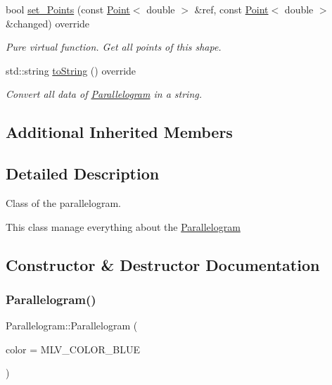 \begin{DoxyCompactItemize}
bool \hyperlink{classParallelogram_ab74583703a60e4b798d7048aa684f44e}{set\+\_\+\+Points} (const \hyperlink{classPoint}{Point}$<$ double $>$ \&ref, const \hyperlink{classPoint}{Point}$<$ double $>$ \&changed) override
\begin{DoxyCompactList}\small\item\em Pure virtual function. Get all points of this shape. \end{DoxyCompactList}\item 
std\+::string \hyperlink{classParallelogram_a9caae0044f23d8a1e87b1a78d852c37f}{to\+String} () override
\begin{DoxyCompactList}\small\item\em Convert all data of \hyperlink{classParallelogram}{Parallelogram} in a string. \end{DoxyCompactList}\end{DoxyCompactItemize}
\subsection*{Additional Inherited Members}


\subsection{Detailed Description}
Class of the parallelogram. 

This class manage everything about the \hyperlink{classParallelogram}{Parallelogram} 

\subsection{Constructor \& Destructor Documentation}
\mbox{\label{classParallelogram_a2200aa50be9b13ccb40a371a3d2b119b}} 
\subsubsection{\texorpdfstring{Parallelogram()}{Parallelogram()}\hspace{0.1cm}{\footnotesize\ttfamily [1/3]}}
{\footnotesize\ttfamily Parallelogram\+::\+Parallelogram (\begin{DoxyParamCaption}\item[{M\+L\+V\+\_\+\+Color}]{color = {\ttfamily MLV\+\_\+COLOR\+\_\+BLUE} }\end{DoxyParamCaption})\hspace{0.3cm}{\ttfamily [explicit]}}



